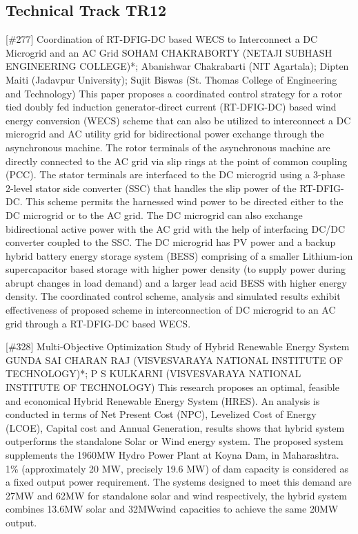 \clearpage \subsection{Technical Track TR12}\nopagebreak {} \begin{abstract_online} {[\#277] Coordination of RT-DFIG-DC based WECS to Interconnect a DC Microgrid and an AC Grid} {} {SOHAM CHAKRABORTY (NETAJI SUBHASH ENGINEERING COLLEGE)*; Abanishwar Chakrabarti (NIT Agartala); Dipten Maiti (Jadavpur University); Sujit Biswas (St. Thomas College of Engineering and Technology)} {} This paper proposes a coordinated control strategy for a rotor tied doubly fed induction generator-direct current (RT-DFIG-DC) based wind energy conversion (WECS) scheme that can also be utilized to interconnect a DC microgrid and AC utility grid for bidirectional power exchange through the asynchronous machine. The rotor terminals of the asynchronous machine are directly connected to the AC grid via slip rings at the point of common coupling (PCC). The stator terminals are interfaced to the DC microgrid using a 3-phase 2-level stator side converter (SSC) that handles the slip power of the RT-DFIG-DC. This scheme permits the harnessed wind power to be directed either to the DC microgrid or to the AC grid. The DC microgrid can also exchange bidirectional active power with the AC grid with the help of interfacing DC/DC converter coupled to the SSC. The DC microgrid has PV power and a backup hybrid battery energy storage system (BESS) comprising of a smaller Lithium-ion supercapacitor based storage with higher power density (to supply power during abrupt changes in load demand) and a larger lead acid BESS with higher energy density. The coordinated control scheme, analysis and simulated results exhibit effectiveness of proposed scheme in interconnection of DC microgrid to an AC grid through a RT-DFIG-DC based WECS. \end{abstract_online} 
{} \begin{abstract_online} {[\#328] Multi-Objective Optimization Study of Hybrid Renewable Energy System} {} {GUNDA SAI CHARAN RAJ (VISVESVARAYA NATIONAL INSTITUTE OF TECHNOLOGY)*; P S KULKARNI (VISVESVARAYA NATIONAL INSTITUTE OF TECHNOLOGY)} {} This research proposes an optimal, feasible and economical Hybrid Renewable Energy System (HRES). An analysis is conducted in terms of Net Present Cost (NPC), Levelized Cost of Energy (LCOE), Capital cost and Annual Generation, results shows that hybrid system outperforms the standalone Solar or Wind energy system. The proposed system supplements the 1960MW Hydro Power Plant at Koyna Dam, in Maharashtra. 1\% (approximately 20 MW, precisely 19.6 MW) of dam capacity is considered as a fixed output power requirement. The systems designed to meet this demand are 27MW and 62MW for standalone solar and wind respectively, the hybrid system combines 13.6MW solar and 32MWwind capacities to achieve the same 20MW output.  \end{abstract_online} 
